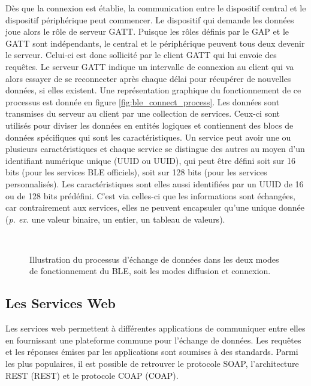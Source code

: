Dès que la connexion est établie, la communication entre le dispositif central et le dispositif périphérique peut commencer. Le dispositif qui demande les données joue alors le rôle de serveur \acs{GATT}. Puisque les rôles définis par le \acs{GAP} et le \acs{GATT} sont indépendants, le central et le périphérique peuvent tous deux devenir le serveur. Celui-ci est donc sollicité par le client \acs{GATT} qui lui envoie des requêtes. Le serveur \acs{GATT} indique un intervalle de connexion au client qui va alors essayer de se reconnecter après chaque délai pour récupérer de nouvelles données, si elles existent. Une représentation graphique du fonctionnement de ce processus est donnée en figure \ref{fig:ble_connect_process}. Les données sont transmises du serveur au client par une collection de services. Ceux-ci sont utilisés pour diviser les données en entités logiques et contiennent des blocs de données spécifiques qui sont les caractéristiques. Un service peut avoir une ou plusieurs caractéristiques et chaque service se distingue des autres au moyen d’un identifiant numérique unique (\acl{UUID} ou \acs{UUID}), qui peut être défini soit sur 16 bits (pour les services BLE officiels), soit sur 128 bits (pour les services personnalisés). Les caractéristiques sont elles aussi identifiées par un \acs{UUID} de 16 ou de 128 bits prédéfini. C'est via celles-ci que les informations sont échangées, car contrairement aux services, elles ne peuvent encapsuler qu'une unique donnée (\textit{p. ex.} une valeur binaire, un entier, un tableau de valeurs).

\begin{figure}[H]
	\centering
    \\[30pt]
	\caption{Illustration du processus d'échange de données dans les deux modes de fonctionnement du \acs{BLE}, soit les modes diffusion et connexion.}
\end{figure}

\subsection{Les Services Web}

Les services web permettent à différentes applications de communiquer entre elles en fournissant une plateforme commune pour l'échange de données. Les requêtes et les réponses émises par les applications sont soumises à des standards. Parmi les plus populaires, il est possible de retrouver le protocole \ac{SOAP}, l'architecture \acl{REST} (\acs{REST}) et le protocole \acl{COAP} (\acs{COAP}).

